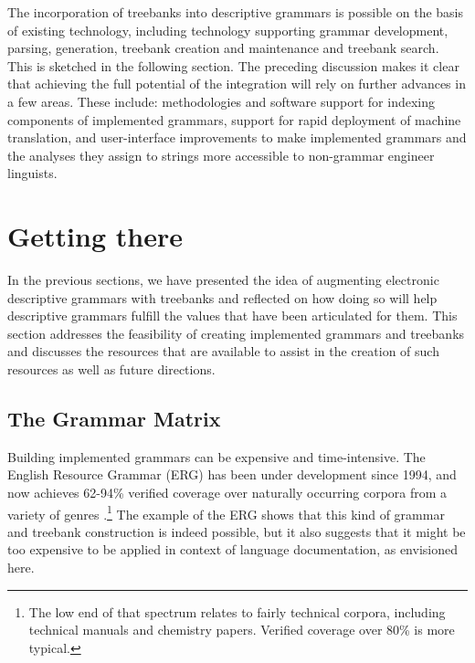 \documentclass[12pt]{article}
\begin{document}

The incorporation of treebanks into descriptive grammars is possible
on the basis of existing technology, including technology supporting
grammar development, parsing, generation, treebank creation and
maintenance and treebank search.  This is sketched in the following
section.  The preceding discussion makes it clear that achieving the
full potential of the integration will rely on further advances in a
few areas. These include: methodologies and software support for
indexing components of implemented grammars, support for rapid
deployment of machine translation, and user-interface improvements to
make implemented grammars and the analyses they assign to strings more
accessible to non-grammar engineer linguists.


\section{Getting there}
\label{sec:gt}

In the previous sections, we have presented the idea of augmenting
electronic descriptive grammars with treebanks and reflected on how
doing so will help descriptive grammars fulfill the values that 
have been articulated for them.  This section addresses the feasibility
of creating implemented grammars and treebanks and discusses the
resources that are available to assist in the creation of such
resources as well as future directions.

\subsection{The Grammar Matrix}
\label{sec:gm}

Building implemented grammars can be expensive and time-intensive.
The English Resource Grammar (ERG) has been under development since 1994,
and now achieves 62-94\% verified coverage over naturally occurring
corpora from a variety of genres \cite{Flickinger:11}.\footnote{The
low end of that spectrum relates to fairly technical corpora,
including technical manuals and chemistry papers.  Verified coverage
over 80\% is more typical.}  The example of the ERG shows that
this kind of grammar and treebank construction is indeed possible,
but it also suggests that it might be too expensive to be applied
in context of language documentation, as envisioned here.
\end{document}
